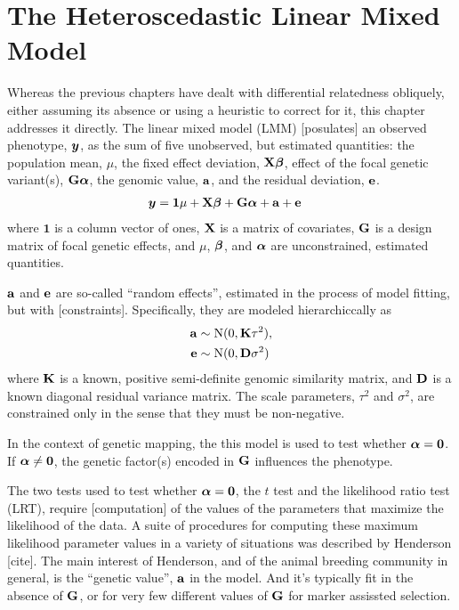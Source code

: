 \chapter{The Heteroscedastic Linear Mixed Model}
\label{chap:het_LMM}

Whereas the previous chapters have dealt with differential relatedness obliquely, either assuming its absence or using a heuristic to correct for it, this chapter addresses it directly.
The linear mixed model (LMM) [posulates] an observed phenotype, $\bm{y}$, as the sum of five unobserved, but estimated quantities: the population mean, $\mu$, the fixed effect deviation, $\mathbf{X}\boldsymbol{\beta}$, effect of the focal genetic variant(s), $\mathbf{G}\boldsymbol{\alpha}$, the genomic value, $\mathbf{a}$, and the residual deviation, $\mathbf{e}$.
\begin{align}
	\bm{y}	&= \mathbf{1}\mu + \mathbf{X}\boldsymbol{\beta} + \mathbf{G}\boldsymbol{\alpha} + \mathbf{a} + \mathbf{e}  \label{eq:lmm}
\end{align}
where $\mathbf{1}$ is a column vector of ones, $\mathbf{X}$ is a matrix of covariates, $\mathbf{G}$ is a design matrix of focal genetic effects, and $\mu$, $\boldsymbol{\beta}$, and $\boldsymbol{\alpha}$ are unconstrained, estimated quantities.

$\mathbf{a}$ and $\mathbf{e}$ are so-called ``random effects'', estimated in the process of model fitting, but with [constraints].
Specifically, they are modeled hierarchiccally as
\begin{align}
    \mathbf{a} &\sim \mathrm{N}(0, \mathbf{K} \tau^2) ,   \label{eq:a}\\
    \mathbf{e} &\sim \mathrm{N}(0, \mathbf{D} \sigma^2)   \label{eq:e}
\end{align}
where $\mathbf{K}$ is a known, positive semi-definite genomic similarity matrix, and $\mathbf{D}$ is a known diagonal residual variance matrix.
The scale parameters, $\tau^2$ and $\sigma^2$, are constrained only in the sense that they must be non-negative.

In the context of genetic mapping, the this model is used to test whether $\boldsymbol{\alpha} = \bm{0}$.
If $\boldsymbol{\alpha} \neq \bm{0}$, the genetic factor(s) encoded in $\mathbf{G}$ influences the phenotype.

The two tests used to test whether $\boldsymbol{\alpha} = \bm{0}$, the $t$ test and the likelihood ratio test (LRT), require [computation] of the values of the parameters that maximize the likelihood of the data.
A suite of procedures for computing these maximum likelihood parameter values in a variety of situations was described by Henderson [cite].
The main interest of Henderson, and of the animal breeding community in general, is the ``genetic value'', $\mathbf{a}$ in the model.
And it's typically fit in the absence of $\mathbf{G}$, or for very few different values of $\mathbf{G}$ for marker assissted selection.



